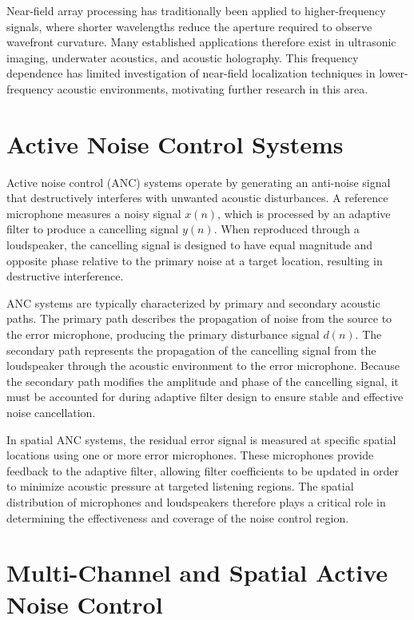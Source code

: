 Near-field array processing has traditionally been applied to higher-frequency signals, where shorter wavelengths reduce the aperture required to observe wavefront curvature. Many established applications therefore exist in ultrasonic imaging, underwater acoustics, and acoustic holography\cite{array_freq_invariance}\cite{hiearchical_holography}. This frequency dependence has limited investigation of near-field localization techniques in lower-frequency acoustic environments, motivating further research in this area.


\section{Active Noise Control Systems}

Active noise control (ANC) systems operate by generating an anti-noise signal that destructively interferes with unwanted acoustic disturbances. A reference microphone measures a noisy signal $x(n)$, which is processed by an adaptive filter to produce a cancelling signal $y(n)$. When reproduced through a loudspeaker, the cancelling signal is designed to have equal magnitude and opposite phase relative to the primary noise at a target location, resulting in destructive interference.

ANC systems are typically characterized by primary and secondary acoustic paths. The primary path describes the propagation of noise from the source to the error microphone, producing the primary disturbance signal $d(n)$. The secondary path represents the propagation of the cancelling signal from the loudspeaker through the acoustic environment to the error microphone. Because the secondary path modifies the amplitude and phase of the cancelling signal, it must be accounted for during adaptive filter design to ensure stable and effective noise cancellation\cite{FXLMS}.

In spatial ANC systems, the residual error signal is measured at specific spatial locations using one or more error microphones\cite{virt_mics}. These microphones provide feedback to the adaptive filter, allowing filter coefficients to be updated in order to minimize acoustic pressure at targeted listening regions. The spatial distribution of microphones and loudspeakers therefore plays a critical role in determining the effectiveness and coverage of the noise control region.

\section{Multi-Channel and Spatial Active Noise Control}

